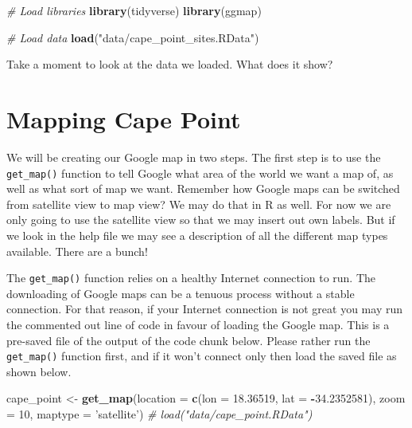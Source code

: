\documentclass[]{book}
\newenvironment{Shaded}{\begin{snugshade}}{\end{snugshade}}
\newcommand{\KeywordTok}[1]{\textcolor[rgb]{0.13,0.29,0.53}{\textbf{#1}}}
\newcommand{\DataTypeTok}[1]{\textcolor[rgb]{0.13,0.29,0.53}{#1}}
\newcommand{\DecValTok}[1]{\textcolor[rgb]{0.00,0.00,0.81}{#1}}
\newcommand{\FloatTok}[1]{\textcolor[rgb]{0.00,0.00,0.81}{#1}}
\newcommand{\StringTok}[1]{\textcolor[rgb]{0.31,0.60,0.02}{#1}}
\newcommand{\CommentTok}[1]{\textcolor[rgb]{0.56,0.35,0.01}{\textit{#1}}}
\newcommand{\OperatorTok}[1]{\textcolor[rgb]{0.81,0.36,0.00}{\textbf{#1}}}
\newcommand{\NormalTok}[1]{#1}
\theoremstyle{definition}
\theoremstyle{definition}
\theoremstyle{definition}
\theoremstyle{remark}
\begin{document}
\begin{Shaded}
\begin{Highlighting}[]
\CommentTok{# Load libraries}
\KeywordTok{library}\NormalTok{(tidyverse)}
\KeywordTok{library}\NormalTok{(ggmap)}

\CommentTok{# Load data}
\KeywordTok{load}\NormalTok{(}\StringTok{"data/cape_point_sites.RData"}\NormalTok{)}
\end{Highlighting}
\end{Shaded}

Take a moment to look at the data we loaded. What does it show?

\section{Mapping Cape Point}\label{mapping-cape-point}

We will be creating our Google map in two steps. The first step is to
use the \texttt{get\_map()} function to tell Google what area of the
world we want a map of, as well as what sort of map we want. Remember
how Google maps can be switched from satellite view to map view? We may
do that in R as well. For now we are only going to use the satellite
view so that we may insert out own labels. But if we look in the help
file we may see a description of all the different map types available.
There are a bunch!

The \texttt{get\_map()} function relies on a healthy Internet connection
to run. The downloading of Google maps can be a tenuous process without
a stable connection. For that reason, if your Internet connection is not
great you may run the commented out line of code in favour of loading
the Google map. This is a pre-saved file of the output of the code chunk
below. Please rather run the \texttt{get\_map()} function first, and if
it won't connect only then load the saved file as shown below.

\begin{Shaded}
\begin{Highlighting}[]
\NormalTok{cape_point <-}\StringTok{ }\KeywordTok{get_map}\NormalTok{(}\DataTypeTok{location =} \KeywordTok{c}\NormalTok{(}\DataTypeTok{lon =} \FloatTok{18.36519}\NormalTok{, }\DataTypeTok{lat =} \OperatorTok{-}\FloatTok{34.2352581}\NormalTok{),}
                        \DataTypeTok{zoom =} \DecValTok{10}\NormalTok{, }\DataTypeTok{maptype =} \StringTok{'satellite'}\NormalTok{)}
\CommentTok{# load("data/cape_point.RData")}
\end{Highlighting}
\end{Shaded}
\end{document}
